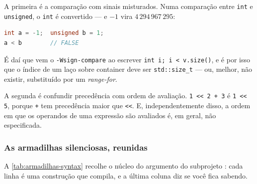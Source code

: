 A primeira é a comparação com sinais misturados. Numa comparação entre
\texttt{int} e \texttt{unsigned}, o \texttt{int} é convertido --- e $-1$ vira
$4\,294\,967\,295$:

\begin{lstlisting}[style=bt, language=C++,
    caption={A comparação que inverte de resultado.}]
int a = -1;  unsigned b = 1;
a < b        // FALSE
\end{lstlisting}

É daí que vem o \texttt{-Wsign-compare} ao escrever \texttt{int i; i <
v.size()}, e é por isso que o índice de um laço sobre container deve ser
\texttt{std::size\_t} --- ou, melhor, não existir, substituído por um
\emph{range-for}.

A segunda é confundir precedência com ordem de avaliação. \texttt{1 << 2 + 3} é
\texttt{1 << 5}, porque \texttt{+} tem precedência maior que \texttt{<<}. E,
independentemente disso, a ordem em que os operandos de uma expressão são
avaliados é, em geral, não especificada.

\subsubsection{As armadilhas silenciosas, reunidas}

A \cref{tab:armadilhas-syntax} recolhe o núcleo do argumento do subprojeto
: cada linha é uma construção que compila, e a última coluna diz
se você fica sabendo.

